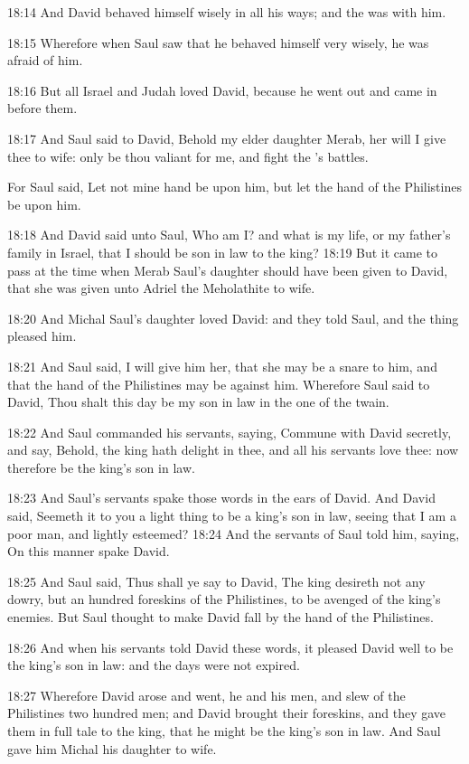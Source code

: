 18:14 And David behaved himself wisely in all his ways; and the \LORD was with him.

18:15 Wherefore when Saul saw that he behaved himself very wisely, he was afraid of him.

18:16 But all Israel and Judah loved David, because he went out and came in before them.

18:17 And Saul said to David, Behold my elder daughter Merab, her will I give thee to wife: only be thou valiant for me, and fight the \LORD's battles.

For Saul said, Let not mine hand be upon him, but let the hand of the Philistines be upon him.

18:18 And David said unto Saul, Who am I? and what is my life, or my father's family in Israel, that I should be son in law to the king?  18:19 But it came to pass at the time when Merab Saul's daughter should have been given to David, that she was given unto Adriel the Meholathite to wife.

18:20 And Michal Saul's daughter loved David: and they told Saul, and the thing pleased him.

18:21 And Saul said, I will give him her, that she may be a snare to him, and that the hand of the Philistines may be against him.  Wherefore Saul said to David, Thou shalt this day be my son in law in the one of the twain.

18:22 And Saul commanded his servants, saying, Commune with David secretly, and say, Behold, the king hath delight in thee, and all his servants love thee: now therefore be the king's son in law.

18:23 And Saul's servants spake those words in the ears of David. And David said, Seemeth it to you a light thing to be a king's son in law, seeing that I am a poor man, and lightly esteemed?  18:24 And the servants of Saul told him, saying, On this manner spake David.

18:25 And Saul said, Thus shall ye say to David, The king desireth not any dowry, but an hundred foreskins of the Philistines, to be avenged of the king's enemies. But Saul thought to make David fall by the hand of the Philistines.

18:26 And when his servants told David these words, it pleased David well to be the king's son in law: and the days were not expired.

18:27 Wherefore David arose and went, he and his men, and slew of the Philistines two hundred men; and David brought their foreskins, and they gave them in full tale to the king, that he might be the king's son in law. And Saul gave him Michal his daughter to wife.


